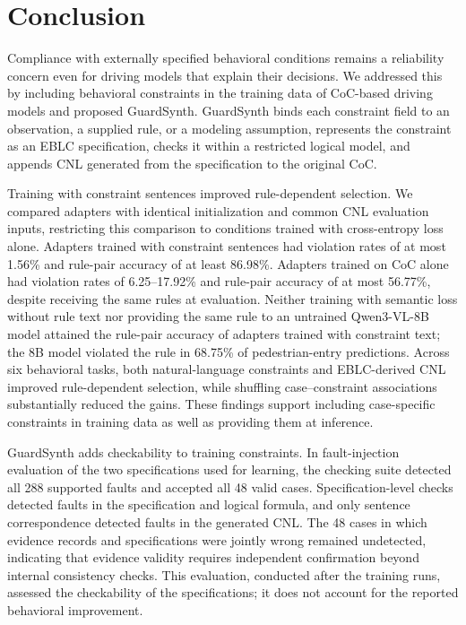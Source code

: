 \section{Conclusion}\label{sec:conclusion}

Compliance with externally specified behavioral conditions remains a reliability
concern even for driving models that explain their decisions. We addressed this
by including behavioral constraints in the training data of CoC-based driving
models and proposed GuardSynth. GuardSynth binds each constraint field to an
observation, a supplied rule, or a modeling assumption, represents the constraint
as an EBLC specification, checks it within a restricted logical model, and
appends CNL generated from the specification to the original CoC.

Training with constraint sentences improved rule-dependent selection. We
compared adapters with identical initialization and common CNL evaluation
inputs, restricting this comparison to conditions trained with cross-entropy
loss alone. Adapters trained with constraint sentences had violation rates of
at most 1.56\% and rule-pair accuracy of at least 86.98\%. Adapters trained on
CoC alone had violation rates of 6.25--17.92\% and rule-pair accuracy of at most
56.77\%, despite receiving the same rules at evaluation. Neither training with
semantic loss without rule text nor providing the same rule to an untrained
Qwen3-VL-8B model attained the rule-pair accuracy of adapters trained with
constraint text; the 8B model violated the rule in 68.75\% of pedestrian-entry
predictions. Across six
behavioral tasks, both natural-language constraints and EBLC-derived CNL
improved rule-dependent selection, while shuffling case--constraint associations
substantially reduced the gains. These findings support including case-specific
constraints in training data as well as providing them at inference.

GuardSynth adds checkability to training constraints. In fault-injection
evaluation of the two specifications used for learning, the checking suite
detected all 288 supported faults and accepted all 48 valid cases.
Specification-level checks detected faults in the specification and logical
formula, and only sentence correspondence detected faults in the generated
CNL. The 48 cases in which evidence records
and specifications were jointly wrong remained undetected, indicating that
evidence validity requires independent confirmation beyond internal consistency
checks. This evaluation, conducted after the training runs, assessed the
checkability of the specifications; it does not account for the reported
behavioral improvement.

